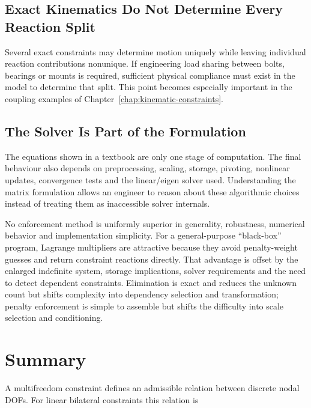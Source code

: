 \subsection{Exact Kinematics Do Not Determine Every Reaction Split}

Several exact constraints may determine motion uniquely while leaving individual
reaction contributions nonunique. If engineering load sharing between bolts,
bearings or mounts is required, sufficient physical compliance must exist in the
model to determine that split. This point becomes especially important in the
coupling examples of Chapter~\ref{chap:kinematic-constraints}.

\subsection{The Solver Is Part of the Formulation}

The equations shown in a textbook are only one stage of computation. The final
behaviour also depends on preprocessing, scaling, storage, pivoting, nonlinear
updates, convergence tests and the linear/eigen solver used. Understanding the
matrix formulation allows an engineer to reason about these algorithmic choices
instead of treating them as inaccessible solver internals.


\begin{notebooknote}
No enforcement method is uniformly superior in generality, robustness, numerical
behavior and implementation simplicity. For a general-purpose ``black-box''
program, Lagrange multipliers are attractive because they avoid penalty-weight
guesses and return constraint reactions directly. That advantage is offset by
the enlarged indefinite system, storage implications, solver requirements and
the need to detect dependent constraints. Elimination is exact and reduces the
unknown count but shifts complexity into dependency selection and transformation;
penalty enforcement is simple to assemble but shifts the difficulty into scale
selection and conditioning.
\end{notebooknote}

\section{Summary}

A multifreedom constraint defines an admissible relation between discrete nodal
DOFs. For linear bilateral constraints this relation is

